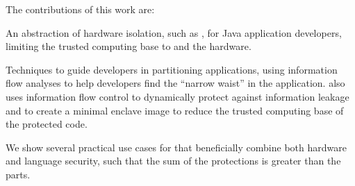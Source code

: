 The contributions of this work are:
\begin{compactitem}
\item An abstraction of hardware isolation, such as \sgx{}, for Java application developers, limiting the trusted computing base to \systemname{} and the hardware.  
\item Techniques to guide developers in partitioning applications, using information flow analyses to help developers find the ``narrow waist'' in the application.  \systemname{} also uses information flow control to dynamically protect against information leakage %
and
to create a minimal enclave image to reduce the trusted computing base of the protected code.
\item We show several practical use cases for \systemname{} that beneficially combine both hardware and language security,
such that the sum of the protections is greater than the parts.

\end{compactitem}

